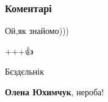  
 
 
 
 
\subsubsection{Коментарі}
\label{sec:30_03_2021.fb.galickij_sergej.1.mova_marshrutka_dnepropetrovsk.cmt}

\begin{itemize}

 
Ой,як знайомо)))

 
+++👍

 
Бєздєльнік

\begin{itemize}
 
\textbf{Олена Юхимчук}, нероба! 🤣💦
\end{itemize}

 


\end{itemize}
